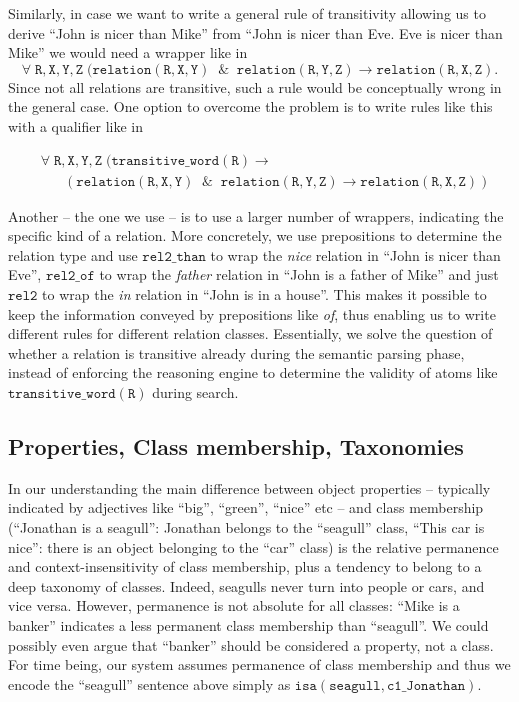 \documentclass[runningheads]{llncs}
\begin{document}
Similarly, in case we want to write a general rule of transitivity allowing us to derive 
``John is nicer than Mike'' from ``John is nicer than Eve. Eve is nicer than Mike''
we would need a wrapper like in 
$$\mathtt{\forall \; R,X,Y,Z \;(relation(R,X,Y) \; \;  \& \; \;  relation(R,Y,Z)  \rightarrow  relation(R,X,Z) }.$$ 
Since not all relations are transitive, such a rule would be conceptually wrong in the general case. One option to overcome
the problem is to write rules like this with a qualifier like in 

\begin{align*}
 &\mathtt{\forall \; R,X,Y,Z \;(transitive\_word(R) \rightarrow }\\
 &\mathtt{\; \; \; \; \; \;(relation(R,X,Y) \; \;  \& \; \;  relation(R,Y,Z)  \rightarrow  relation(R,X,Z))}
\end{align*}
 
Another -- the one we use -- is to use a larger number of wrappers, indicating the specific
kind of a relation.  More concretely, we use prepositions to determine the relation type and use 
$\mathtt{rel2\_than}$ to wrap the {\em nice} relation in ``John is nicer than Eve'',
$\mathtt{rel2\_of}$ to wrap the {\em father} relation in ``John is a father of Mike'' and just
$\mathtt{rel2}$ to wrap the {\em in} relation in ``John is in a house''. 
This makes it possible to keep the information conveyed by prepositions like {\em of}, thus enabling us to write
different rules for different relation classes. Essentially, we solve the question of whether a relation
is transitive already during the semantic parsing phase, instead of enforcing the reasoning engine to 
determine the validity of atoms like $\mathtt{transitive\_word(R)}$ during search.

\subsection{Properties, Class membership, Taxonomies}

In our understanding the main difference between object properties -- typically indicated by adjectives like ``big'', ``green'', ``nice'' etc --
and class membership (``Jonathan is a seagull'': Jonathan belongs to the ``seagull'' class, ``This car is nice'': there is an object belonging to the ``car'' class)
is the relative permanence and context-insensitivity of class membership, plus a tendency to belong to a deep taxonomy of classes.
Indeed, seagulls never turn into people or cars, and vice versa.
However, permanence is not absolute for all classes: ``Mike is a banker'' indicates a less permanent class membership than ``seagull''. We
could possibly even argue that ``banker'' should be considered a property, not a class. For time being, our system assumes permanence of 
class membership and thus we encode the ``seagull'' sentence above simply as $\mathtt{isa(seagull,c1\_Jonathan)}$.
\end{document}
